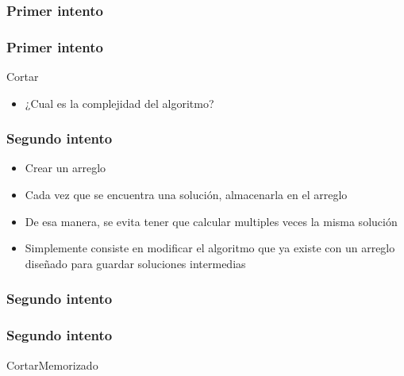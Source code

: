 \documentclass{beamer}
\begin{document}
\begin{frame}
    \frametitle{Primer intento}
\end{frame}    

\begin{frame}
    \frametitle{Primer intento}
    \begin{algorithm}[H]
        \caption{Cortar}
        \begin{algorithmic}[1]
        \EndIf
        \EndFor
        \EndProcedure
        \end{algorithmic}
    \end{algorithm}

    \begin{itemize}
        \item{¿Cual es la complejidad del algoritmo?}
    \end{itemize}
    \end{frame}

\begin{frame}
\frametitle{Segundo intento}
\begin{itemize}
\item{Crear un arreglo}
\item{Cada vez que se encuentra una soluci\'on, almacenarla en el arreglo}
\item{De esa manera, se evita tener que calcular multiples veces la misma soluci\'on}
\item{Simplemente consiste en modificar el algoritmo que ya existe con un arreglo
dise\~nado para guardar soluciones intermedias}
\end{itemize}
\end{frame}

\begin{frame}
\frametitle{Segundo intento}
\end{frame}

\begin{frame}
    \frametitle{Segundo intento}
    \begin{algorithm}[H]
        \caption{CortarMemorizado}
        \begin{algorithmic}[1]
        \EndFor
        \EndProcedure
        \end{algorithmic}
    \end{algorithm}
\end{frame}
\end{document}
